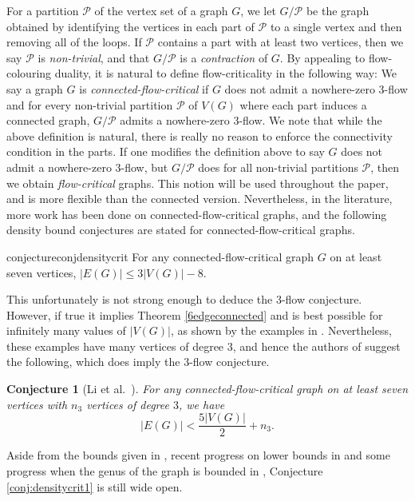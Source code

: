 \documentclass{article}
\newcommand{\PP}{\mathcal{P}}
\newtheorem{conjecture}[theorem]{Conjecture}
\begin{document}
For a
partition $\PP$ of the vertex set of a graph $G$, we let $G /
\PP$ be the graph obtained by identifying the vertices in each part of
$\PP$ to a single vertex and then removing all of the loops. If
$\PP$ contains a part with at least two vertices, then we say
$\PP$ is \textit{non-trivial}, and that $G / \PP$ is a
\textit{contraction} of $G$. By appealing to flow-colouring duality, it is natural
to define flow-criticality in the following way: We say a graph $G$ is
\textit{connected-flow-critical} if $G$ does not admit a nowhere-zero $3$-flow
and for every non-trivial partition $\PP$ of $V(G)$ where each part
induces a connected graph, $G / \PP$ admits a nowhere-zero $3$-flow. We
note that while the above definition is natural, there is really no reason to
enforce the connectivity condition in the parts. If one modifies the definition
above to say $G$ does not admit a nowhere-zero $3$-flow, but $G / \PP$
does for all non-trivial partitions $\PP$, then we obtain
\textit{flow-critical} graphs. This notion will be used throughout the paper,
and is more flexible than the connected version. Nevertheless, in the
literature, more work has been done on connected-flow-critical graphs, and the
following density bound conjectures are stated for connected-flow-critical
graphs.

\begin{restatable}[Li et al.~\cite{li20223}]{conjecture}{conjdensitycrit}
\label{conj:densitycrit1}
For any connected-flow-critical graph $G$ on at least seven vertices, $|E(G)| \leq 3|V(G)|-8$.
\end{restatable}

This unfortunately is not strong enough to deduce the $3$-flow conjecture. However, if true it implies Theorem \ref{6edgeconnected} and is best possible for infinitely many values of $|V(G)|$, as shown by the examples in \cite{li20223}. Nevertheless, these examples have many vertices of degree 3, and hence the authors of \cite{li20223} suggest the following, which does imply the $3$-flow conjecture.

\begin{conjecture}[Li et al.~\cite{li20223}]\label{conj:li}
For any connected-flow-critical graph on at least seven vertices with $n_{3}$ vertices of degree $3$, we have
$$|E(G)| < \frac{5|V(G)|}{2} +n_{3}.$$
\end{conjecture}

Aside from the bounds given in \cite{li20223}, recent progress on lower bounds in \cite{dvořák2024sparsity} and some progress when the genus of the graph is bounded in \cite{bojanzdenek}, Conjecture \ref{conj:densitycrit1} is still wide open. 
\end{document}
